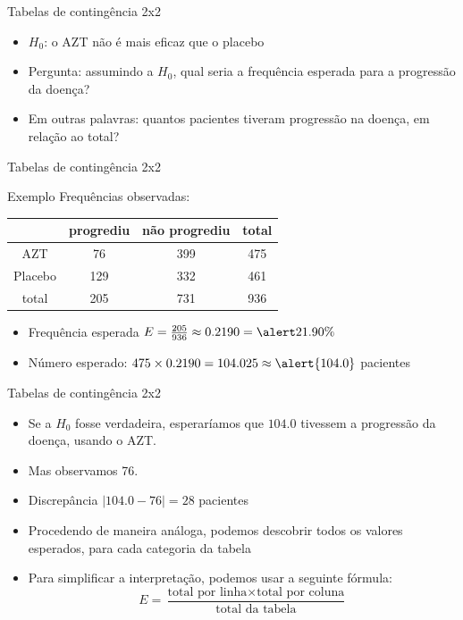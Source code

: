 \documentclass{beamer}
\begin{document}
\begin{frame}{Tabelas de contingência 2x2}
  \begin{itemize}
  \item $H_0$: o AZT não é mais eficaz que o placebo
  \item Pergunta: assumindo a $H_0$, qual seria a frequência esperada
    para a progressão da doença?
  \item Em outras palavras: quantos pacientes tiveram progressão na
    doença, em relação ao total?
  \end{itemize}
\end{frame}

\begin{frame}{Tabelas de contingência 2x2}
  \begin{exampleblock}{Exemplo}
    Frequências observadas:
    \begin{tabular}{c|c|c|c}
      & progrediu & não progrediu & total\\
      \hline
      AZT & 76 & 399 & 475\\
      \hline
      Placebo & 129 & 332 & 461\\
      \hline
      total & \alert{205} & 731 & \alert{936}\\
    \end{tabular}
  \end{exampleblock}
  \begin{itemize}
  \item Frequência esperada $E = \frac{205}{936} \approx 0.2190 = \alert{21.90\%}$
  \item Número esperado: $475 \times 0.2190 = 104.025 \approx \alert{104.0}$
    pacientes
  \end{itemize}
\end{frame}

\begin{frame}{Tabelas de contingência 2x2}
  \begin{itemize}
  \item Se a $H_0$ fosse verdadeira, esperaríamos que $104.0$ tivessem
    a progressão da doença, usando o AZT.
  \item Mas observamos 76.
  \item Discrepância $|104.0 - 76| = 28$ pacientes
  \item Procedendo de maneira análoga, podemos descobrir todos os
    valores esperados, para cada categoria da tabela
  \item Para simplificar a interpretação, podemos usar a seguinte fórmula:
  \begin{displaymath}
    E = \frac{ \text{total por linha} \times \text{total por coluna}
    }{ \text{total da tabela} }
  \end{displaymath}
  \end{itemize}
\end{frame}
\end{document}
